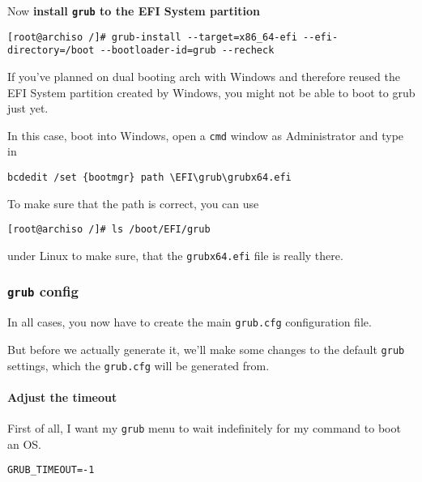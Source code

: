 \documentclass[10pt]{dustdoc}
\begin{document}
Now \textbf{install \texttt{grub} to the EFI System partition}

\begin{verbatim}
[root@archiso /]# grub-install --target=x86_64-efi --efi-directory=/boot --bootloader-id=grub --recheck
\end{verbatim}

\begin{IMPORTANT}
    If you’ve planned on dual booting arch with Windows and therefore reused the EFI System partition created by Windows, you might not be able to boot to grub just yet.

    In this case, boot into Windows, open a \texttt{cmd} window as Administrator and type in

    \begin{verbatim}
bcdedit /set {bootmgr} path \EFI\grub\grubx64.efi
    \end{verbatim}

    To make sure that the path is correct, you can use

    \begin{verbatim}
[root@archiso /]# ls /boot/EFI/grub
    \end{verbatim}

    \noindent
    under Linux to make sure, that the \texttt{grubx64.efi} file is really there.
\end{IMPORTANT}

\subsubsection{\texttt{grub} config}
\label{sec:grub-config}

In all cases, you now have to create the main \texttt{grub.cfg} configuration file.

But before we actually generate it, we’ll make some changes to the default \texttt{grub} settings, which the \texttt{grub.cfg} will be generated from.

\paragraph{Adjust the timeout}
\label{par:adjust-the-timeout}

First of all, I want my \texttt{grub} menu to wait indefinitely for my command to boot an OS.

\begin{verbatim}
GRUB_TIMEOUT=-1
\end{verbatim}
\end{document}
